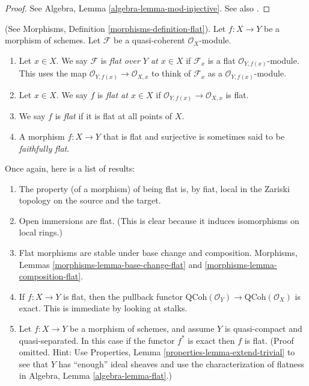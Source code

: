 \begin{proof}
See Algebra, Lemma \ref{algebra-lemma-mod-injective}.
See also \cite[Section 20]{MatCA}.
\end{proof}

\begin{definition}
\label{definition-flat-schemes}
(See Morphisms, Definition \ref{morphisms-definition-flat}).
Let $f : X \to Y$ be a morphism of schemes.
Let $\mathcal{F}$ be a quasi-coherent $\mathcal{O}_X$-module.
\begin{enumerate}
\item Let $x \in X$. We say $\mathcal{F}$ is
{\it flat over $Y$ at $x \in X$} if $\mathcal{F}_x$
is a flat $\mathcal{O}_{Y, f(x)}$-module.
This uses the map $\mathcal{O}_{Y, f(x)} \to \mathcal{O}_{X, x}$ to
think of $\mathcal{F}_x$ as a $\mathcal{O}_{Y, f(x)}$-module.
\item Let $x \in X$. We say $f$ is {\it flat at $x \in X$}
if $\mathcal{O}_{Y, f(x)} \to \mathcal{O}_{X, x}$ is flat.
\item We say $f$ is {\it flat} if it is flat at all points of $X$.
\item A morphism $f : X \to Y$ that is flat and surjective is sometimes
said to be {\it faithfully flat}.
\end{enumerate}
\end{definition}

\noindent
Once again, here is a list of results:
\begin{enumerate}
\item The property (of a morphism) of being flat is, by fiat,
local in the Zariski topology on the source and the target.
\item Open immersions are flat. (This is clear because it induces isomorphisms
on local rings.)
\item Flat morphisms are stable under base change and composition.
Morphisms, Lemmas \ref{morphisms-lemma-base-change-flat} and
\ref{morphisms-lemma-composition-flat}.
\item If $f : X \to Y$ is flat, then the pullback functor
$\text{QCoh}(\mathcal{O}_Y) \to \text{QCoh}(\mathcal{O}_X)$ is exact.
This is immediate by looking at stalks.
\item Let $f : X \to Y$ be a morphism of schemes, and assume $Y$
is quasi-compact and quasi-separated. In this case
if the functor $f^*$ is exact then $f$ is flat.
(Proof omitted. Hint: Use
Properties, Lemma \ref{properties-lemma-extend-trivial} to see that
$Y$ has ``enough'' ideal sheaves and use the characterization of
flatness in Algebra, Lemma \ref{algebra-lemma-flat}.)
\end{enumerate}

